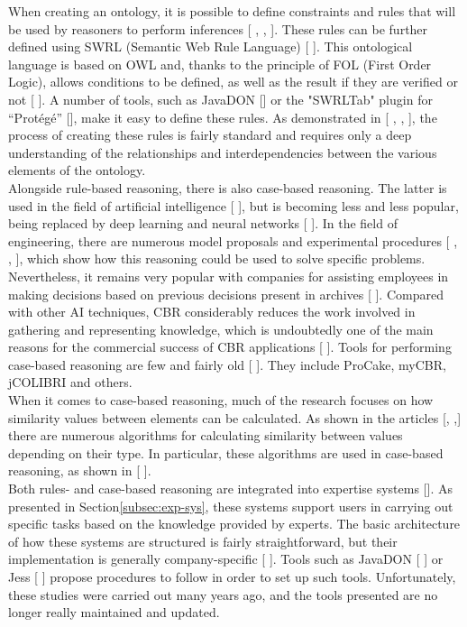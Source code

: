             When creating an ontology, it is possible to define constraints and rules that will be used by reasoners to perform inferences [ , , ]. These rules can be further defined using SWRL (Semantic Web Rule Language) [ ]. This ontological language is based on OWL and, thanks to the principle of FOL (First Order Logic), allows conditions to be defined, as well as the result if they are verified or not [ ]. A number of tools, such as JavaDON [] or the "SWRLTab" plugin for “Protégé” [], make it easy to define these rules. As demonstrated in [ , , ], the process of creating these rules is fairly standard and requires only a deep understanding of the relationships and interdependencies between the various elements of the ontology.\\

            Alongside rule-based reasoning, there is also case-based reasoning. The latter is used in the field of artificial intelligence [ ], but is becoming less and less popular, being replaced by deep learning and neural networks [ ]. In the field of engineering, there are numerous model proposals and experimental procedures [ , , ], which show how this reasoning could be used to solve specific problems. Nevertheless, it remains very popular with companies for assisting employees in making decisions based on previous decisions present in archives [ ]. Compared with other AI techniques, CBR considerably reduces the work involved in gathering and representing knowledge, which is undoubtedly one of the main reasons for the commercial success of CBR applications [ ]. Tools for performing case-based reasoning are few and fairly old [ ]. They include ProCake, myCBR, jCOLIBRI and others.\\

            When it comes to case-based reasoning, much of the research focuses on how similarity values between elements can be calculated. As shown in the articles [, ,] there are numerous algorithms for calculating similarity between values depending on their type. In particular, these algorithms are used in case-based reasoning, as shown in [ ].\\

            Both rules- and case-based reasoning are integrated into expertise systems []. As presented in Section\ref{subsec:exp-sys}, these systems support users in carrying out specific tasks based on the knowledge provided by experts. The basic architecture of how these systems are structured is fairly straightforward, but their implementation is generally company-specific [ ]. Tools such as JavaDON [ ] or Jess [ ] propose procedures to follow in order to set up such tools. Unfortunately, these studies were carried out many years ago, and the tools presented are no longer really maintained and updated.\\


